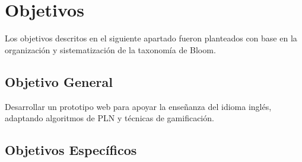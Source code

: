 
\section{Objetivos}

Los objetivos descritos en el siguiente apartado fueron planteados con base en la organización y sistematización de la taxonomía de Bloom.

\subsection{Objetivo General}

Desarrollar un prototipo web para apoyar la enseñanza del idioma inglés, adaptando algoritmos de PLN y técnicas de gamificación.

\subsection{Objetivos Específicos}
